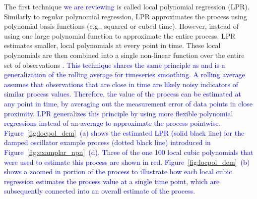 \documentclass[man, floatsintext]{apa7}
\begin{document}
The first technique \textcolor{blue}{we are reviewing} is called local
polynomial regression (LPR). Similarly to regular polynomial regression, LPR
approximates the process using polynomial basis functions (e.g., squared or
cubed time). However, instead of using one large polynomial function to
approximate the entire process, LPR estimates smaller, local polynomials at
every point in time. These local polynomials are then combined into a single
non-linear function over the entire set of observations
\parencite{fan_adaptive_1995, ruppert_multivariate_1994, fan_local_2018}.
\textcolor{blue}{This technique shares the same principle as and is a
  generalization of the rolling average for timeseries smoothing. A rolling
  average assumes that observations that are close in time are likely noisy
  indicators of similar process values. Therefore, the value of the process can
  be estimated at any point in time, by averaging out the measurement error of
  data points in close proximity. LPR generalizes this principle by using more
  flexible polynomial regressions instead of an average to approximate the
  process pointwise.
  Figure~\ref{fig:locpol_dem}~(a) shows the estimated LPR (solid black line)
  for the damped oscillator example process (dotted black line) introduced in
  Figure~\ref{fig:examplar_npn}~(d). Three of the one 100 local cubic
  polynomials that were used to estimate this process are shown in red.
  Figure~\ref{fig:locpol_dem}~(b) shows a zoomed in portion of the process to
  illustrate how each local cubic regression estimates the process value at a
  single time point, which are subsequently connected into an overall estimate
  of the process.}

\begin{sidewaysfigure*}[htbp]
  \caption{Demonstration of a local polynomial regression}
  \label{fig:locpol_dem}
\end{sidewaysfigure*}
\end{document}
